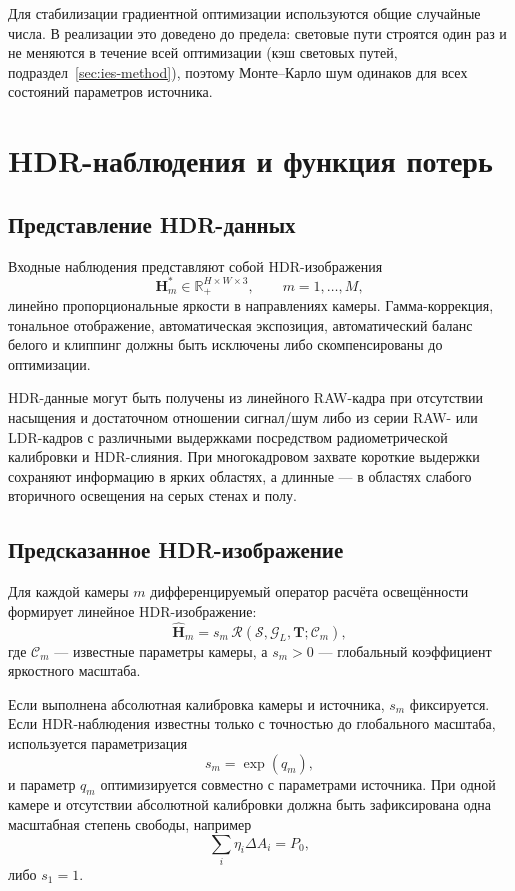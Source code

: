 Для стабилизации градиентной оптимизации используются общие случайные числа. В реализации это доведено до предела: световые пути строятся один раз и не меняются в течение всей оптимизации (кэш световых путей, подраздел~\ref{sec:ies-method}), поэтому Монте--Карло шум одинаков для всех состояний параметров источника.

\section{HDR-наблюдения и функция потерь}

\subsection{Представление HDR-данных}

Входные наблюдения представляют собой HDR-изображения
\begin{equation}
\mathbf{H}_m^\ast\in\mathbb{R}_+^{H\times W\times 3},
\qquad
m=1,\ldots,M,
\end{equation}
линейно пропорциональные яркости в направлениях камеры. Гамма-коррекция, тональное отображение, автоматическая экспозиция, автоматический баланс белого и клиппинг должны быть исключены либо скомпенсированы до оптимизации.

HDR-данные могут быть получены из линейного RAW-кадра при отсутствии насыщения и достаточном отношении сигнал/шум либо из серии RAW- или LDR-кадров с различными выдержками посредством радиометрической калибровки и HDR-слияния. При многокадровом захвате короткие выдержки сохраняют информацию в ярких областях, а длинные --- в областях слабого вторичного освещения на серых стенах и полу.

\subsection{Предсказанное HDR-изображение}

Для каждой камеры $m$ дифференцируемый оператор расчёта освещённости формирует линейное HDR-изображение:
\begin{equation}
\hat{\mathbf{H}}_m
=
s_m\,
\mathcal{R}
\left(
\mathcal{S},
\mathcal{G}_L,
\mathbf{T};
\mathcal{C}_m
\right),
\end{equation}
где $\mathcal{C}_m$ --- известные параметры камеры, а $s_m>0$ --- глобальный коэффициент яркостного масштаба.

Если выполнена абсолютная калибровка камеры и источника, $s_m$ фиксируется. Если HDR-наблюдения известны только с точностью до глобального масштаба, используется параметризация
\begin{equation}
s_m=\exp(q_m),
\end{equation}
и параметр $q_m$ оптимизируется совместно с параметрами источника. При одной камере и отсутствии абсолютной калибровки должна быть зафиксирована одна масштабная степень свободы, например
\begin{equation}
\sum_i\eta_i\Delta A_i=P_0,
\end{equation}
либо $s_1=1$.

